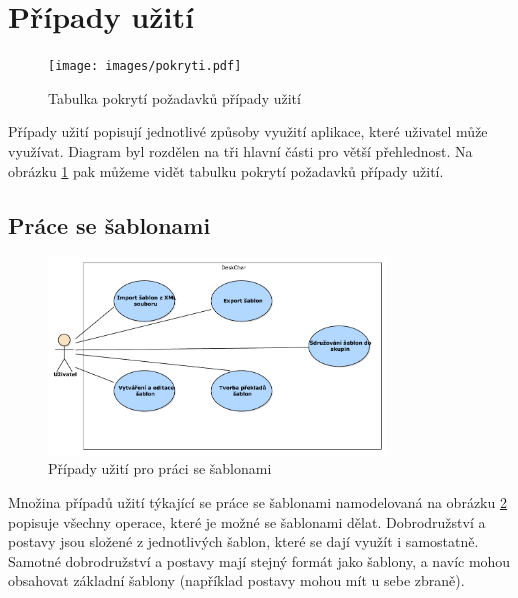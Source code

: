 \documentclass[thesis=B,czech]{resources/FITthesis}[2012/06/26]
\begin{document}
	\section{Případy užití}	
	\label{part:usecase}
	\begin{figure}\centering
		\texttt{[image: images/pokryti.pdf]}
		\caption[Tabulka pokrytí požadavků případy užití]{Tabulka pokrytí požadavků případy užití}
		\label{fig:pokryti}
	\end{figure}
Případy užití popisují jednotlivé způsoby využití aplikace, které uživatel může využívat. Diagram byl rozdělen na tři hlavní části pro větší přehlednost. Na obrázku \ref{fig:pokryti} pak můžeme vidět tabulku pokrytí požadavků případy užití.

\subsection{Práce se šablonami}
	\begin{figure}\centering
		\includegraphics[width=0.8\textwidth]{images/usecase-sablony.pdf}
		\caption[Případy užití pro šablony]{Případy užití pro práci se šablonami}			\label{fig:uc_sablony}
	\end{figure}

Množina případů užití týkající se práce se šablonami namodelovaná na obrázku \ref{fig:uc_sablony} popisuje všechny operace, které je možné se šablonami dělat. Dobrodružství a postavy jsou složené z jednotlivých šablon, které se dají využít i samostatně. Samotné dobrodružství a postavy mají stejný formát jako šablony, a navíc mohou obsahovat základní šablony (například postavy mohou mít u sebe zbraně).
\end{document}
